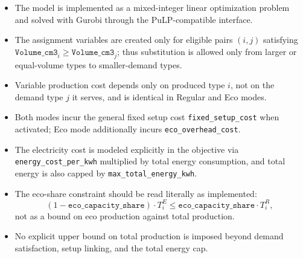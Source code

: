 \begin{itemize}
\item The model is implemented as a mixed-integer linear optimization problem and solved with Gurobi through the PuLP-compatible interface.
\item The assignment variables are created only for eligible pairs $(i,j)$ satisfying $\texttt{Volume\_cm3}_i \ge \texttt{Volume\_cm3}_j$; thus substitution is allowed only from larger or equal-volume types to smaller-demand types.
\item Variable production cost depends only on produced type $i$, not on the demand type $j$ it serves, and is identical in Regular and Eco modes.
\item Both modes incur the general fixed setup cost \texttt{fixed\_setup\_cost} when activated; Eco mode additionally incurs \texttt{eco\_overhead\_cost}.
\item The electricity cost is modeled explicitly in the objective via \texttt{energy\_cost\_per\_kwh} multiplied by total energy consumption, and total energy is also capped by \texttt{max\_total\_energy\_kwh}.
\item The eco-share constraint should be read literally as implemented:
\[
(1-\texttt{eco\_capacity\_share})\cdot T^E_i \le \texttt{eco\_capacity\_share}\cdot T^R_i,
\]
not as a bound on eco production against total production.
\item No explicit upper bound on total production is imposed beyond demand satisfaction, setup linking, and the total energy cap.
\end{itemize}
